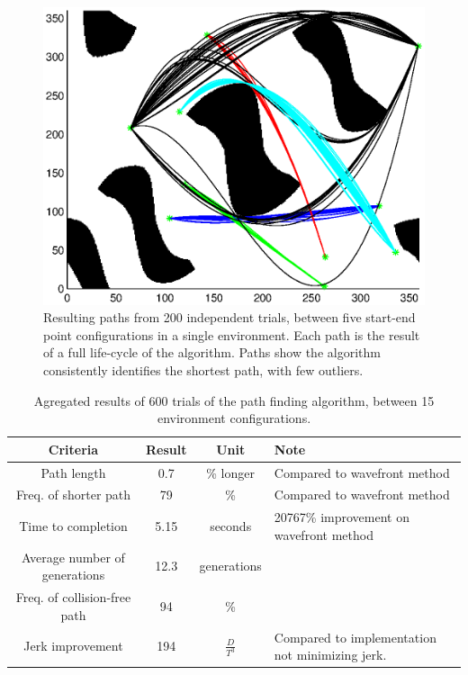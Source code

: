 \begin{figure}[h]
	\centering
	\includegraphics[width=\figWidth]{./figures/results_cSpace4.eps}
	\caption{Resulting paths from 200 independent trials, between five start-end point configurations in a single environment. Each path is the result of a full life-cycle of the algorithm. Paths show the algorithm consistently identifies the shortest path, with few outliers.}
	\label{fig:res600}
\end{figure}

\begin{table}
\renewcommand{\arraystretch}{1.4}
\caption{Agregated results of 600 trials of the path finding algorithm, between 15 environment configurations.}
\label{tbl:results}
\begin{center}
		\begin{tabular}{ c | c  c  p{1.8cm} }
		Criteria & Result & Unit & Note \\ \hline
		Path length & 0.7 & \% longer & Compared to wavefront method \\
		Freq. of shorter path & 79 & \% & Compared to wavefront method \\
		Time to completion & 5.15 & seconds & 20767\% improvement on wavefront method \\
		Average number of generations & 12.3 & generations & \\
		Freq. of collision-free path & 94 & \% &  \\
		Jerk improvement & 194 & ${\frac{D}{T^3}}$ & Compared to implementation not minimizing jerk.\\
\end{tabular}
\end{center}
\end{table}